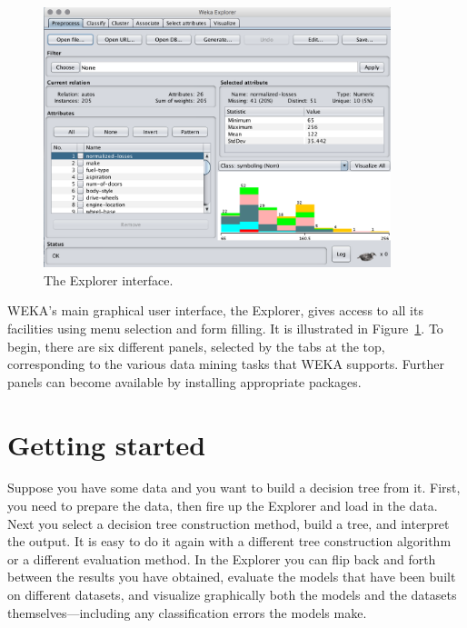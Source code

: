 \begin{figure}[!th]
\centering
\includegraphics[width=0.9\textwidth]{images/B2_1.png}
\caption{The Explorer interface.}
\label{fig:explorer}
\end{figure}

WEKA's main graphical user interface, the Explorer, gives access to
all its facilities using menu selection and form filling. It is
illustrated in Figure~\ref{fig:explorer}. To begin, there are six
different panels, selected by the tabs at the top, corresponding to
the various data mining tasks that WEKA supports. Further panels can
become available by installing appropriate packages.


\section{Getting started}
\label{sect:getting_started}

Suppose you have some data and you want to build a decision tree from
it. First, you need to prepare the data, then fire up the Explorer and
load in the data. Next you select a decision tree construction method,
build a tree, and interpret the output. It is easy to do it again with
a different tree construction algorithm or a different evaluation
method. In the Explorer you can flip back and forth between the
results you have obtained, evaluate the models that have been built on
different datasets, and visualize graphically both the models and the
datasets themselves---including any classification errors the models
make.

